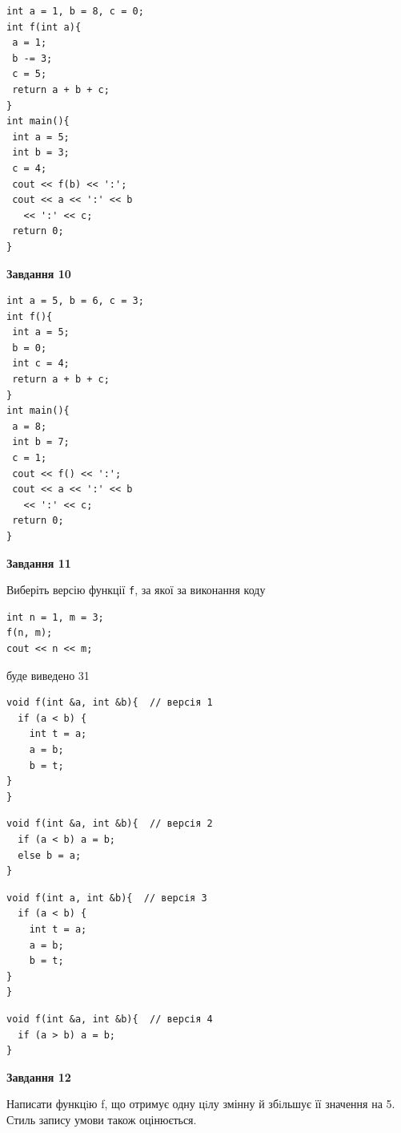 \documentclass[12pt, ukrainian]{article}
\def\code#1{\Verb!#1!}
\begin{document}
{\begin {large}
\begin{minipage}[t]{7.0cm}
\begin{verbatim}
int a = 1, b = 8, c = 0;
int f(int a){
 a = 1;
 b -= 3;
 c = 5;
 return a + b + c;
}
int main(){
 int a = 5;
 int b = 3;
 c = 4;
 cout << f(b) << ':';
 cout << a << ':' << b 
   << ':' << c;
 return 0;
}
\end{verbatim}



\begin{center}
\textbf{Завдання 10}
\end{center}
\vspace{-8mm}

\begin{verbatim}
int a = 5, b = 6, c = 3;
int f(){
 int a = 5;
 b = 0;
 int c = 4;
 return a + b + c;
}
int main(){
 a = 8;
 int b = 7;
 c = 1;
 cout << f() << ':';
 cout << a << ':' << b 
   << ':' << c;
 return 0;
}
\end{verbatim}

\end{minipage}
\vline \hspace{1mm}
\begin{minipage}[t]{11.0cm}

\begin{center}
\textbf{Завдання 11}
\end{center}
Виберіть версію функції \code{f}, за якої за виконання коду
\begin{verbatim}
int n = 1, m = 3;
f(n, m);
cout << n << m;
\end{verbatim}

буде виведено 31

\begin{verbatim}
void f(int &a, int &b){  // версія 1
  if (a < b) {
    int t = a;
    a = b;
    b = t;
}  
}
\end{verbatim}

\vspace{-8mm}\begin{verbatim}
void f(int &a, int &b){  // версія 2
  if (a < b) a = b;
  else b = a;
}
\end{verbatim}

\vspace{-8mm}\begin{verbatim}
void f(int a, int &b){  // версія 3
  if (a < b) {
    int t = a;
    a = b;
    b = t;
}  
}
\end{verbatim}

\vspace{-8mm}\begin{verbatim}
void f(int &a, int &b){  // версія 4
  if (a > b) a = b;
}
\end{verbatim}



\begin{center}
\textbf{Завдання 12}
\end{center}

Написати функцiю f, що отримує одну цiлу змінну й збiльшує її значення на 5. Стиль запису умови також оцінюється.\par

\end{minipage}

\end {large}}
\newpage
\end{document}
